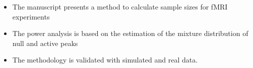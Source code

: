 \begin{itemize}
  \item The manuscript presents a method to calculate sample sizes for fMRI experiments
  \item The power analysis is based on the estimation of the mixture distribution of null and active peaks
  \item The methodology is validated with simulated and real data.
\end{itemize}
